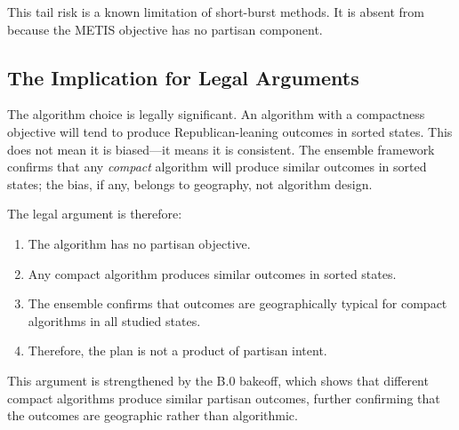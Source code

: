 This tail risk is a known limitation of short-burst methods.  It is absent
from \ar{} because the METIS objective has no partisan component.

\subsection{The Implication for Legal Arguments}

The algorithm choice is legally significant.  An algorithm with a
compactness objective will tend to produce Republican-leaning outcomes in
sorted states.  This does not mean it is biased---it means it is consistent.
The ensemble framework confirms that any \emph{compact} algorithm will
produce similar outcomes in sorted states; the bias, if any, belongs to
geography, not algorithm design.

The legal argument is therefore:
\begin{enumerate}
  \item The \ar{} algorithm has no partisan objective.
  \item Any compact algorithm produces similar outcomes in sorted states.
  \item The ensemble confirms that \ar{} outcomes are geographically typical
    for compact algorithms in all studied states.
  \item Therefore, the \ar{} plan is not a product of partisan intent.
\end{enumerate}

This argument is strengthened by the B.0 bakeoff, which shows that different
compact algorithms produce similar partisan outcomes, further confirming that
the outcomes are geographic rather than algorithmic.
